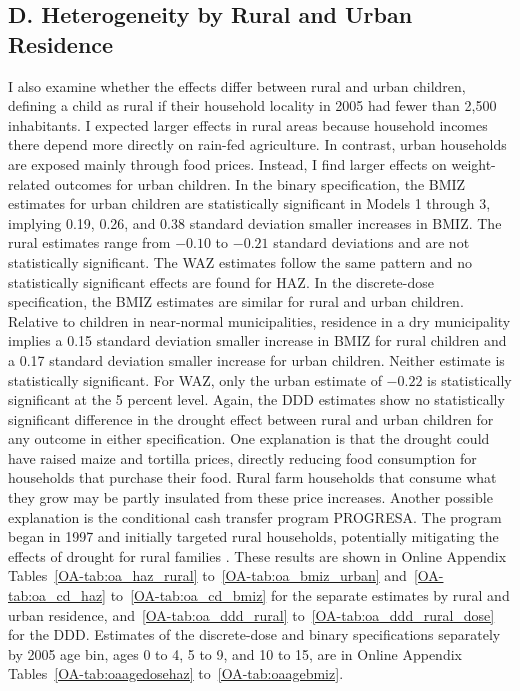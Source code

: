 \subsection*{D. Heterogeneity by Rural and Urban Residence}

I also examine whether the effects differ between rural and urban children, defining a child as rural if their household locality in 2005 had fewer than 2,500 inhabitants. I expected larger effects in rural areas because household incomes there depend more directly on rain-fed agriculture. In contrast, urban households are exposed mainly through food prices. Instead, I find larger effects on weight-related outcomes for urban children. In the binary specification, the BMIZ estimates for urban children are statistically significant in Models 1 through 3, implying 0.19, 0.26, and 0.38 standard deviation smaller increases in BMIZ. The rural estimates range from $-0.10$ to $-0.21$ standard deviations and are not statistically significant. The WAZ estimates follow the same pattern and no statistically significant effects are found for HAZ. In the discrete-dose specification, the BMIZ estimates are similar for rural and urban children. Relative to children in near-normal municipalities, residence in a dry municipality implies a 0.15 standard deviation smaller increase in BMIZ for rural children and a 0.17 standard deviation smaller increase for urban children. Neither estimate is statistically significant. For WAZ, only the urban estimate of $-0.22$ is statistically significant at the 5 percent level. Again, the DDD estimates show no statistically significant difference in the drought effect between rural and urban children for any outcome in either specification. One explanation is that the drought could have raised maize and tortilla prices, directly reducing food consumption for households that purchase their food. Rural farm households that consume what they grow may be partly insulated from these price increases. Another possible explanation is the conditional cash transfer program PROGRESA. The program began in 1997 and initially targeted rural households, potentially mitigating the effects of drought for rural families \parencite{adhvaryuHelpingChildrenCatch2024}. These results are shown in Online Appendix Tables~\ref{OA-tab:oa_haz_rural} to~\ref{OA-tab:oa_bmiz_urban} and~\ref{OA-tab:oa_cd_haz} to~\ref{OA-tab:oa_cd_bmiz} for the separate estimates by rural and urban residence, and~\ref{OA-tab:oa_ddd_rural} to~\ref{OA-tab:oa_ddd_rural_dose} for the DDD. Estimates of the discrete-dose and binary specifications separately by 2005 age bin, ages 0 to 4, 5 to 9, and 10 to 15, are in Online Appendix Tables~\ref{OA-tab:oaagedosehaz} to~\ref{OA-tab:oaagebmiz}.

